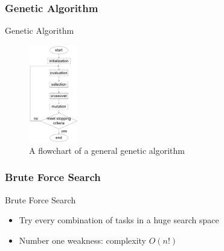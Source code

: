 {{    \subsubsection{Genetic Algorithm} %
    \label{sub:genetic_algorithm}

        \begin{frame}{Genetic Algorithm}{}
        \begin{figure}
            \centering
            \includegraphics[width=80px]{Grafik/GeneticFlow}
                \caption{A flowchart of a general genetic algorithm}
            \label{GeneticFlow}
        \end{figure}
        \end{frame}

    \subsubsection{Brute Force Search} %
    \label{sub:bruteforce}

    \begin{frame}{Brute Force Search}{}
    \begin{itemize}
        \item{Try every combination of tasks in a huge search space}
        \item{Number one weakness: complexity $O(n!)$}
    \end{itemize}
    \end{frame}

}}
